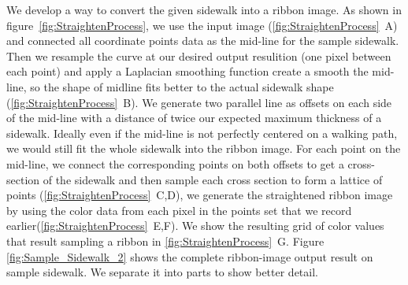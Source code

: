 

We develop a way to convert the given sidewalk into a ribbon image. 
As shown in figure~\ref{fig:StraightenProcess}, we use the input image (\figurename{}\ref{fig:StraightenProcess}~A) 
and connected all coordinate points data as the mid-line for the sample sidewalk. 
Then we resample the curve at our desired output resulition (one pixel between each point) 
and apply a Laplacian smoothing function create a smooth the mid-line, so the shape of 
midline fits better to the actual sidewalk shape (\figurename{}\ref{fig:StraightenProcess}~B). 
We generate two parallel line as offsets on each side of the mid-line with a distance of twice 
our expected maximum thickness of a sidewalk. 
Ideally even if the mid-line is not perfectly centered on a walking path, we would 
still fit the whole sidewalk into the ribbon image. 
For each point on the mid-line, we connect the corresponding points on both offsets to get 
a cross-section of the sidewalk and then sample each cross section to form a lattice 
of points (\figurename{}\ref{fig:StraightenProcess}~C,D),
we generate the straightened ribbon image by using the color data from each pixel in 
the points set that we record earlier(\figurename{}\ref{fig:StraightenProcess}~E,F).
We show the resulting grid of color values that result sampling a ribbon in \figurename{}\ref{fig:StraightenProcess}~G.
Figure \ref{fig:Sample_Sidewalk_2} shows the complete ribbon-image output result on sample sidewalk. We separate it into parts to show better detail. 


